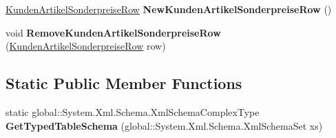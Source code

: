 \begin{DoxyCompactItemize}
\item 
\hyperlink{class_products_1_1_data_1_1ds_sage_1_1_kunden_artikel_sonderpreise_row}{Kunden\+Artikel\+Sonderpreise\+Row} {\bfseries New\+Kunden\+Artikel\+Sonderpreise\+Row} ()\hypertarget{class_products_1_1_data_1_1ds_sage_1_1_kunden_artikel_sonderpreise_data_table_a70dcb2cc7636fa47727f05881dd03382}{}\label{class_products_1_1_data_1_1ds_sage_1_1_kunden_artikel_sonderpreise_data_table_a70dcb2cc7636fa47727f05881dd03382}

\item 
void {\bfseries Remove\+Kunden\+Artikel\+Sonderpreise\+Row} (\hyperlink{class_products_1_1_data_1_1ds_sage_1_1_kunden_artikel_sonderpreise_row}{Kunden\+Artikel\+Sonderpreise\+Row} row)\hypertarget{class_products_1_1_data_1_1ds_sage_1_1_kunden_artikel_sonderpreise_data_table_a80c99c0bfe3ee406a3f2755b99953b56}{}\label{class_products_1_1_data_1_1ds_sage_1_1_kunden_artikel_sonderpreise_data_table_a80c99c0bfe3ee406a3f2755b99953b56}

\end{DoxyCompactItemize}
\subsection*{Static Public Member Functions}
\begin{DoxyCompactItemize}
\item 
static global\+::\+System.\+Xml.\+Schema.\+Xml\+Schema\+Complex\+Type {\bfseries Get\+Typed\+Table\+Schema} (global\+::\+System.\+Xml.\+Schema.\+Xml\+Schema\+Set xs)\hypertarget{class_products_1_1_data_1_1ds_sage_1_1_kunden_artikel_sonderpreise_data_table_ac80410e8b32c58b501234a0ca1ad0688}{}\label{class_products_1_1_data_1_1ds_sage_1_1_kunden_artikel_sonderpreise_data_table_ac80410e8b32c58b501234a0ca1ad0688}

\end{DoxyCompactItemize}
